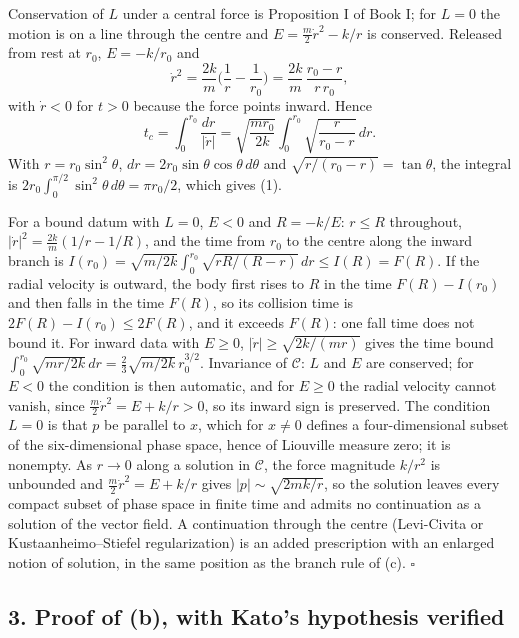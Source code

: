 \documentclass[11pt,a4paper]{article}
\begin{document}
Conservation of \(L\) under a central force is Proposition I of Book I;
for \(L=0\) the motion is on a line through the centre and
\(E=\tfrac m2\dot r^2-k/r\) is conserved. Released from rest at \(r_0\),
\(E=-k/r_0\) and
\[\dot r^2=\frac{2k}m\Big(\frac1r-\frac1{r_0}\Big)=\frac{2k}{m}\,\frac{r_0-r}{r\,r_0},\]
with \(\dot r<0\) for \(t>0\) because the force points inward. Hence
\[t_c=\int_0^{r_0}\frac{dr}{|\dot r|}
=\sqrt{\frac{m r_0}{2k}}\int_0^{r_0}\sqrt{\frac{r}{r_0-r}}\,dr.\] With
\(r=r_0\sin^2\theta\), \(dr=2r_0\sin\theta\cos\theta\,d\theta\) and
\(\sqrt{r/(r_0-r)}=\tan\theta\), the integral is
\(2r_0\int_0^{\pi/2}\sin^2\theta\,d\theta=\pi r_0/2\), which gives (1).

For a bound datum with \(L=0\), \(E<0\) and \(R=-k/E\): \(r\le R\)
throughout, \(|\dot r|^2=\tfrac{2k}m(1/r-1/R)\), and the time from
\(r_0\) to the centre along the inward branch is
\(I(r_0)=\sqrt{m/2k}\int_0^{r_0}\sqrt{rR/(R-r)}\,dr\le I(R)=F(R)\). If
the radial velocity is outward, the body first rises to \(R\) in the
time \(F(R)-I(r_0)\) and then falls in the time \(F(R)\), so its
collision time is \(2F(R)-I(r_0)\le2F(R)\), and it exceeds \(F(R)\): one
fall time does not bound it. For inward data with \(E\ge0\),
\(|\dot r|\ge\sqrt{2k/(mr)}\) gives the time bound
\(\int_0^{r_0}\sqrt{mr/2k}\,dr=\tfrac23\sqrt{m/2k}\,r_0^{3/2}\).
Invariance of \(\mathcal C\): \(L\) and \(E\) are conserved; for \(E<0\)
the condition is then automatic, and for \(E\ge0\) the radial velocity
cannot vanish, since \(\tfrac m2\dot r^2=E+k/r>0\), so its inward sign
is preserved. The condition \(L=0\) is that \(p\) be parallel to \(x\),
which for \(x\neq0\) defines a four-dimensional subset of the
six-dimensional phase space, hence of Liouville measure zero; it is
nonempty. As \(r\to0\) along a solution in \(\mathcal C\), the force
magnitude \(k/r^2\) is unbounded and \(\tfrac m2\dot r^2=E+k/r\) gives
\(|p|\sim\sqrt{2mk/r}\), so the solution leaves every compact subset of
phase space in finite time and admits no continuation as a solution of
the vector field. A continuation through the centre (Levi-Civita or
Kustaanheimo--Stiefel regularization) is an added prescription with an
enlarged notion of solution, in the same position as the branch rule of
(c). \(\square\)

\subsection{3. Proof of (b), with Kato's hypothesis
verified}\label{proof-of-b-with-katos-hypothesis-verified}
\end{document}
